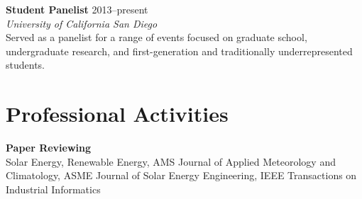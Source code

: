 \documentclass[10pt]{res}
\begin{document}
\begin{resume}
\textbf{Student Panelist} \hfill 2013--present \\
\textit{University of California San Diego} \\
Served as a panelist for a range of events focused on graduate school,
undergraduate research, and first-generation and traditionally underrepresented
students.


\section{Professional Activities}
\vspace{0.1in}

\textbf{Paper Reviewing} \\
Solar Energy, Renewable Energy, AMS Journal of Applied Meteorology and
Climatology, ASME Journal of Solar Energy Engineering, IEEE Transactions on
Industrial Informatics


%
%
%
%
%



\end{resume}
\end{document}
